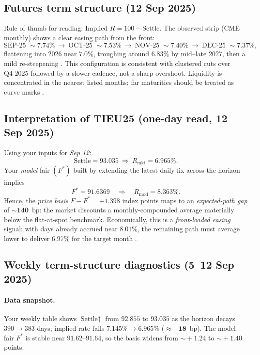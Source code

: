 \documentclass[11pt,a4paper]{article} %
\begin{document}
\subsection{Futures term structure (12 Sep 2025)}
Rule of thumb for reading: \(\text{Implied }R = 100 - \text{Settle}\). The observed strip (CME monthly) shows a clear easing path from the front:
\[
\text{SEP-25 } \sim \mathbf{7.74\%}\ \to\ \text{OCT-25 } \sim \mathbf{7.53\%}\ \to\ \text{NOV-25 } \sim \mathbf{7.40\%}\ \to\ \text{DEC-25 } \sim \mathbf{7.37\%},
\]
flattening into 2026 near \(7.0\%\), troughing around \(6.83\%\) by mid–late 2027, then a mild re-steepening \citep{cme_tiie_monthly_quotes}. This configuration is consistent with clustered cuts over \(\text{Q4-2025}\) followed by a slower cadence, not a sharp overshoot. Liquidity is concentrated in the nearest listed months; far maturities should be treated as curve marks \citep{cme_tiie_monthly_overview,cme_tiie_monthly_quotes}.

\subsection{Interpretation of \texorpdfstring{TIEU25}{TIEU25} (one-day read, 12 Sep 2025)}
Using your inputs for \emph{Sep 12}:
\[
\text{Settle} = \mathbf{93.035}\ \Rightarrow\ R_{\text{mkt}}=\mathbf{6.965\%}.
\]
Your \emph{model} fair \((F^{*})\) built by extending the latest daily fix across the horizon implies
\[
F^{*}=\mathbf{91.6369}\quad\Rightarrow\quad R_{\text{mod}}=\mathbf{8.363\%}.
\]
Hence, the \emph{price basis} \(F-F^{*}=\mathbf{+1.398}\) index points maps to an \emph{expected-path gap} of \(\sim\mathbf{140}\)~bp: the market discounts a monthly-compounded average materially below the flat-at-spot benchmark. Economically, this is a \emph{front-loaded easing} signal: with days already accrued near \(8.01\%\), the remaining path must average lower to deliver \(6.97\%\) for the target month \citep{banxico_on_method_en,cme_tiie_monthly_method}.

\subsection{Weekly term-structure diagnostics (5–12 Sep 2025)}
\paragraph{Data snapshot.} Your weekly table shows \(\text{Settle}\uparrow\) from \(\mathbf{92.855}\) to \(\mathbf{93.035}\) as the horizon decays \(390\to383\) days; implied rate falls \(\mathbf{7.145\%\to6.965\%}\) (\(\approx \mathbf{-18}\)~bp). The model fair \(F^{*}\) is stable near \(91.62\)–\(91.64\), so the basis widens from \(\sim\!+1.24\) to \(\sim\!+1.40\) points.
\end{document}
